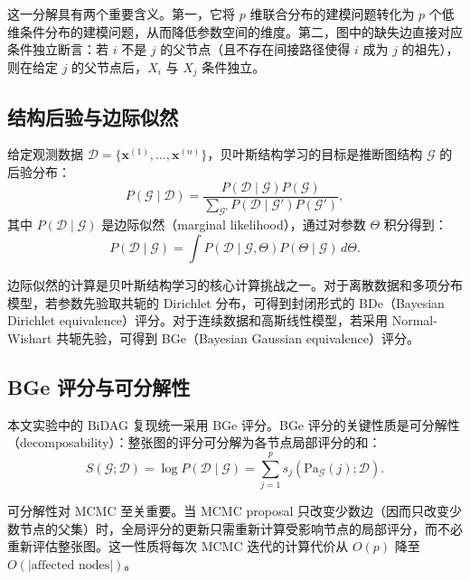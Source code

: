 \documentclass[UTF8,a4paper,12pt]{ctexart}
\begin{document}
这一分解具有两个重要含义。第一，它将 $p$ 维联合分布的建模问题转化为 $p$ 个低维条件分布的建模问题，从而降低参数空间的维度。第二，图中的缺失边直接对应条件独立断言：若 $i$ 不是 $j$ 的父节点（且不存在间接路径使得 $i$ 成为 $j$ 的祖先），则在给定 $j$ 的父节点后，$X_i$ 与 $X_j$ 条件独立。

\subsection{结构后验与边际似然}

给定观测数据 $\mathcal{D} = \{\mathbf{x}^{(1)}, \ldots, \mathbf{x}^{(n)}\}$，贝叶斯结构学习的目标是推断图结构 $\mathcal{G}$ 的后验分布：
\begin{equation}\label{eq:posterior}
P(\mathcal{G} \mid \mathcal{D}) = \frac{P(\mathcal{D} \mid \mathcal{G}) P(\mathcal{G})}{\sum_{\mathcal{G}'} P(\mathcal{D} \mid \mathcal{G}') P(\mathcal{G}')},
\end{equation}
其中 $P(\mathcal{D} \mid \mathcal{G})$ 是边际似然（marginal likelihood），通过对参数 $\Theta$ 积分得到：
\begin{equation}\label{eq:marginal}
P(\mathcal{D} \mid \mathcal{G}) = \int P(\mathcal{D} \mid \mathcal{G}, \Theta) P(\Theta \mid \mathcal{G}) \, d\Theta.
\end{equation}

边际似然的计算是贝叶斯结构学习的核心计算挑战之一。对于离散数据和多项分布模型，若参数先验取共轭的 Dirichlet 分布，可得到封闭形式的 BDe（Bayesian Dirichlet equivalence）评分。对于连续数据和高斯线性模型，若采用 Normal-Wishart 共轭先验，可得到 BGe（Bayesian Gaussian equivalence）评分。

\subsection{BGe 评分与可分解性}

本文实验中的 BiDAG 复现统一采用 BGe 评分。BGe 评分的关键性质是可分解性（decomposability）\citep{heckerman1995learning}：整张图的评分可分解为各节点局部评分的和：
\begin{equation}\label{eq:decomposable}
S(\mathcal{G}; \mathcal{D}) = \log P(\mathcal{D} \mid \mathcal{G}) = \sum_{j=1}^{p} s_j(\mathrm{Pa}_{\mathcal{G}}(j); \mathcal{D}).
\end{equation}

可分解性对 MCMC 至关重要。当 MCMC proposal 只改变少数边（因而只改变少数节点的父集）时，全局评分的更新只需重新计算受影响节点的局部评分，而不必重新评估整张图。这一性质将每次 MCMC 迭代的计算代价从 $O(p)$ 降至 $O(|\text{affected nodes}|)$。
\end{document}

